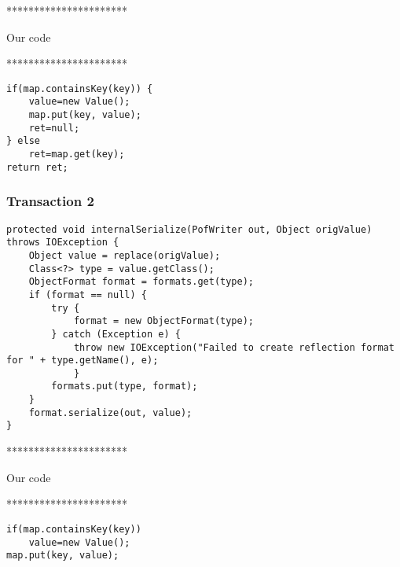 **********************

Our code

**********************

\begin{lstlisting}
if(map.containsKey(key)) {
	value=new Value();
	map.put(key, value);
	ret=null;
} else
	ret=map.get(key);
return ret;
\end{lstlisting}

\subsubsection{Transaction 2}
\begin{lstlisting}
protected void internalSerialize(PofWriter out, Object origValue) throws IOException {
	Object value = replace(origValue);
	Class<?> type = value.getClass();
	ObjectFormat format = formats.get(type);
	if (format == null) {
		try {
			format = new ObjectFormat(type);
		} catch (Exception e) {
			throw new IOException("Failed to create reflection format for " + type.getName(), e);
			}
		formats.put(type, format);
	}
	format.serialize(out, value);
}
\end{lstlisting}


**********************

Our code

**********************

\begin{lstlisting}
if(map.containsKey(key))
	value=new Value();
map.put(key, value);
\end{lstlisting}